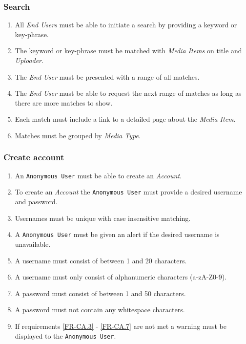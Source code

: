 

%

\label{sec:Functional Requirements}


\subsubsection {Search}

\begin{enumerate}[label=\textbf{FR-\twodigits*}]

	\item All \textit{End Users} must be able to initiate a search by providing a keyword or key-phrase.
	\item The keyword or key-phrase must be matched with \textit{Media Items} on title and \textit{Uploader}.
	\item The \textit{End User} must be presented with a range of all matches.
	\item The \textit{End User} must be able to request the next range of matches as long as there are more matches to show.
	\item Each match must include a link to a detailed page about the \textit{Media Item}.
	\item Matches must be grouped by \textit{Media Type}. 
\end{enumerate}	
			
\subsubsection{Create account}

\begin{enumerate}[label=\textbf{FR-\twodigits*}, resume]
	\item An \texttt{Anonymous User} must be able to create an \textit{Account}.
	\item To create an \textit{Account} the \texttt{Anonymous User} must provide a desired username and password.
	\item Usernames must be unique with case insensitive matching. \label{FR-CA.3}
	\item A \texttt{Anonymous User} must be given an alert if the desired username is unavailable.
	\item A username must consist of between 1 and 20 characters.
	\item A username must only consist of alphanumeric characters (a-zA-Z0-9).
	\item A password must consist of between 1 and 50 characters. 
	\label{FR-CA.6}
	\item A password must not contain any whitespace characters. \label{FR-CA.7}
	\item If requirements \ref{FR-CA.3} - \ref{FR-CA.7} are not met a warning must be displayed to the \texttt{Anonymous User}.
\end{enumerate}
	
